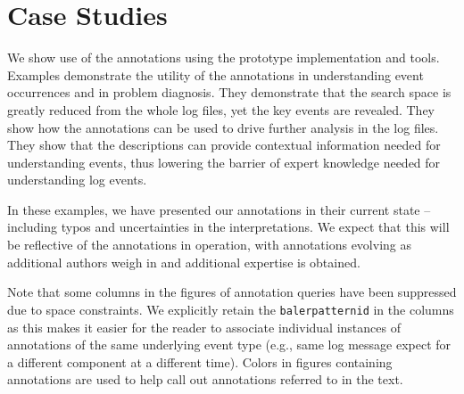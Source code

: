 \section{Case Studies}
\label{s:examples}

We show use of the annotations using the prototype implementation and tools. Examples
demonstrate the utility of the annotations in understanding
event occurrences and in problem diagnosis. They demonstrate that
the search space is greatly reduced from the whole log files, yet
the key events are revealed. They show how the annotations can be
used to drive further analysis in the log files. They show that
the descriptions can provide contextual information needed
for understanding events, thus lowering the barrier of
expert knowledge needed for understanding log events.

In these examples, we have presented our annotations in their current
state -- including typos and uncertainties in the interpretations.
We expect that this will be reflective of the annotations
in operation, with annotations evolving as additional authors
weigh in and additional expertise is obtained.

Note that some columns in the figures of annotation queries have been suppressed due to space
constraints. We explicitly retain the \texttt{balerpatternid} in the columns as this makes it easier
for the reader to associate individual instances of annotations of the same underlying event type
(e.g., same log message expect for a different component at a different time).
Colors in figures containing annotations are used to help call out annotations
referred to in the text.





